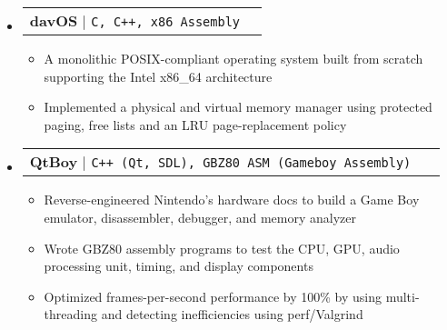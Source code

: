 \documentclass[letterpaper,10pt]{article}
\makeatletter
\newcommand{\resumeItem}[1]{
  \item\small{
    {#1 \vspace{-2pt}}
  }
}
\newcommand{\resumeProjectHeading}[2]{
    \item
    \begin{tabular*}{0.97\textwidth}{l@{\extracolsep{\fill}}r}
      \small#1 & #2 \\
    \end{tabular*}\vspace{-7pt}
}
\newcommand{\resumeSubHeadingListStart}{\begin{itemize}[leftmargin=0.15in, label={}]}
\newcommand{\resumeSubHeadingListEnd}{\end{itemize}}
\newcommand{\resumeItemListStart}{\begin{itemize}}
\newcommand{\resumeItemListEnd}{\end{itemize}\vspace{-5pt}}
\makeatother
\begin{document}
    \resumeSubHeadingListStart
      \resumeProjectHeading
          {\textbf{davOS}
            \href{https://github.com/davidtranhq/davOS}{\faicon{github}}
            $|$ \texttt{C, C++, x86 Assembly}
          }{}
          \resumeItemListStart
            \resumeItem{ A monolithic POSIX-compliant operating system built from scratch supporting the Intel x86\_64 architecture}
            \resumeItem{ Implemented a physical and virtual memory manager using protected paging, free lists and an LRU page-replacement policy }
          \resumeItemListEnd
      \resumeProjectHeading
          {\textbf{QtBoy}
            \href{https://github.com/davidtranhq/qtboy}{\faicon{github}}
            $|$ \texttt{C++ (Qt, SDL), GBZ80 ASM (Gameboy Assembly) }
          }{}
          \resumeItemListStart
            \resumeItem{ Reverse-engineered Nintendo's hardware docs to build a Game Boy emulator, disassembler, debugger, and memory analyzer}
            \resumeItem{ Wrote GBZ80 assembly programs to test the CPU, GPU, audio processing unit, timing, and display components}
            \resumeItem{ Optimized frames-per-second performance by 100\% by using multi-threading and detecting inefficiencies using perf/Valgrind }
          \resumeItemListEnd



    \resumeSubHeadingListEnd
\end{document}
